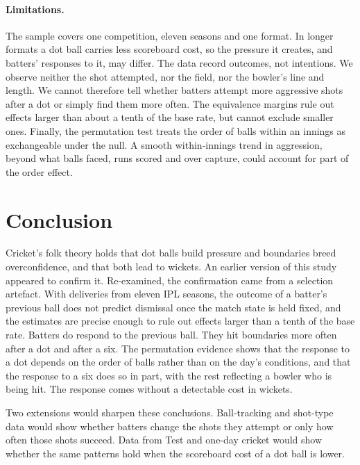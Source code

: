 \documentclass[11pt]{article}
\begin{document}
\paragraph{Limitations.} The sample covers one competition, eleven seasons and one format. In longer formats a dot ball carries less scoreboard cost, so the pressure it creates, and batters' responses to it, may differ. The data record outcomes, not intentions. We observe neither the shot attempted, nor the field, nor the bowler's line and length. We cannot therefore tell whether batters attempt more aggressive shots after a dot or simply find them more often. The equivalence margins rule out effects larger than about a tenth of the base rate, but cannot exclude smaller ones. Finally, the permutation test treats the order of balls within an innings as exchangeable under the null. A smooth within-innings trend in aggression, beyond what balls faced, runs scored and over capture, could account for part of the order effect.

\section{Conclusion}\label{sec:conclusion}

Cricket's folk theory holds that dot balls build pressure and boundaries breed overconfidence, and that both lead to wickets. An earlier version of this study appeared to confirm it. Re-examined, the confirmation came from a selection artefact. With \FacedDeliveries{} deliveries from eleven IPL seasons, the outcome of a batter's previous ball does not predict dismissal once the match state is held fixed, and the estimates are precise enough to rule out effects larger than a tenth of the base rate. Batters do respond to the previous ball. They hit boundaries more often after a dot and after a six. The permutation evidence shows that the response to a dot depends on the order of balls rather than on the day's conditions, and that the response to a six does so in part, with the rest reflecting a bowler who is being hit. The response comes without a detectable cost in wickets.

Two extensions would sharpen these conclusions. Ball-tracking and shot-type data would show whether batters change the shots they attempt or only how often those shots succeed. Data from Test and one-day cricket would show whether the same patterns hold when the scoreboard cost of a dot ball is lower.
\end{document}
